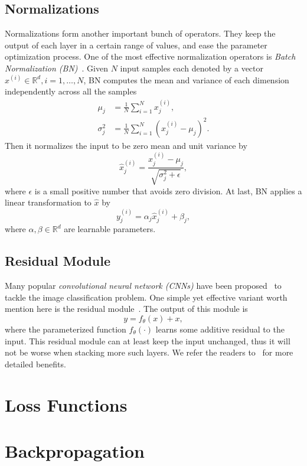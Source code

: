 
\subsection{Normalizations} %
\label{sub:dl-normalizations}
Normalizations form another important bunch of operators. They keep the output of each layer in a certain range of values, and ease the parameter optimization process. One of the most effective normalization operators is \emph{Batch Normalization (BN)}~\cite{ioffe2015batch}. Given $N$ input samples each denoted by a vector $x^{(i)}\in\mathbb{R}^d, i=1,\dots,N$, BN computes the mean and variance of each dimension independently across all the samples
\begin{align}
  \mu_j &= \frac{1}{N} \sum_{i=1}^N x_j^{(i)},\\
  \sigma_j^2 &= \frac{1}{N} \sum_{i=1}^N (x_j^{(i)} - \mu_j)^2.
\end{align}
Then it normalizes the input to be zero mean and unit variance by
\begin{equation}
  \hat{x}_j^{(i)} = \frac{x_j^{(i)} - \mu_j}{\sqrt{\sigma_j^2 + \epsilon}},
\end{equation}
where $\epsilon$ is a small positive number that avoids zero division. At last, BN applies a linear transformation to $\hat{x}$ by
\begin{equation}
  y_j^{(i)} = \alpha_j \hat{x}_j^{(i)} + \beta_j,
\end{equation}
where $\alpha,\beta\in\mathbb{R}^d$ are learnable parameters.



\subsection{Residual Module} %
\label{sub:dl-residual}
Many popular \emph{convolutional neural network (CNNs)} have been proposed~\cite{krizhevsky2012imagenet,simonyan2014very,szegedy2014going} to tackle the image classification problem. One simple yet effective variant worth mention here is the residual module~\cite{he2015deep}. The output of this module is
\begin{equation}
  y = f_\theta(x) + x,
\end{equation}
where the parameterized function $f_\theta(\cdot)$ learns some additive residual to the input. This residual module can at least keep the input unchanged, thus it will not be worse when stacking more such layers. We refer the readers to~\cite{he2015deep,he2016identity} for more detailed benefits.




\section{Loss Functions} %
\label{sec:dl-loss}


\section{Backpropagation} %
\label{sec:dl-bp}

